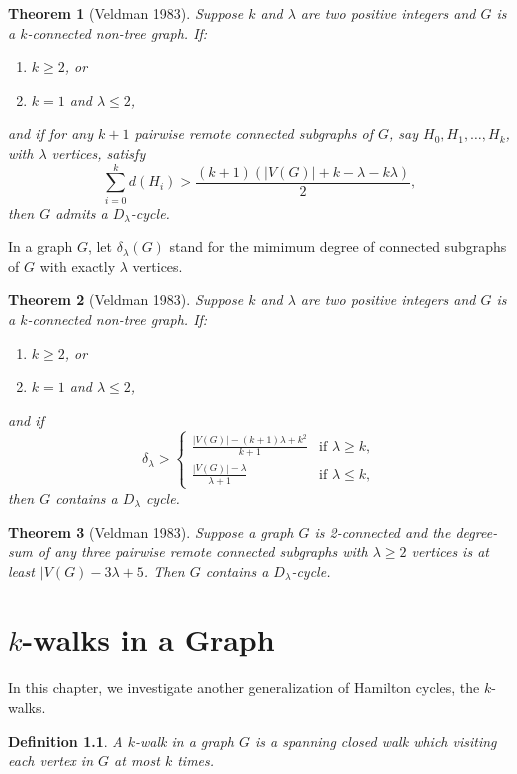 \documentclass[12pt]{report}
\newtheorem{theorem}{Theorem}
\newtheorem{definition}{Definition}
\begin{document}
\begin{theorem}[Veldman 1983]\label{thm3inveldlamc83}
Suppose $k$ and $\lambda$ are two positive integers and $G$ is a $k$-connected non-tree graph. If:
\begin{enumerate}
\item $k\ge2$, or
\item $k=1$ and $\lambda\le2$,
\end{enumerate}
and if for any $k+1$ pairwise remote connected subgraphs of $G$, say $H_0,H_1,\ldots,H_k$, with $\lambda$ vertices, satisfy $$\sum^k_{i=0}d(H_i)>\frac{(k+1)(|V(G)|+k-\lambda-k\lambda)}{2},$$
then $G$ admits a $D_{\lambda}$-cycle.

\end{theorem}
In a graph $G$, let $\delta_{\lambda}(G)$ stand for the mimimum degree of connected subgraphs of $G$ with exactly $\lambda$ vertices.
\begin{theorem}[Veldman 1983]\label{thm4inveldlamc83}
Suppose $k$ and $\lambda$ are two positive integers and $G$ is a $k$-connected non-tree graph. If:
\begin{enumerate}
\item $k\ge2$, or
\item $k=1$ and $\lambda\le2$,
\end{enumerate}
and if $$\delta_{\lambda}>\left\{\begin{array}{cc}\frac{|V(G)|-(k+1)\lambda+k^2}{k+1}&\text{if }\lambda\ge k,\\ \frac{|V(G)|-\lambda}{\lambda+1}&\text{if }\lambda\le k,\end{array}\right.$$
then $G$ contains a $D_{\lambda}$ cycle.
\end{theorem}

\begin{theorem}[Veldman 1983]\label{thm5inveldlamc83}
Suppose a graph $G$ is 2-connected and the degree-sum of any three pairwise remote connected subgraphs with $\lambda\ge2$ vertices is at least $|V(G)-3\lambda+5$. Then $G$ contains a $D_{\lambda}$-cycle.

\end{theorem}










\chapter{$k$-walks in a Graph}\label{ch4kw}
In this chapter, we investigate another generalization of Hamilton cycles, the $k$-walks. 
\begin{definition}\label{defkwalk}
A $k$-walk in a graph $G$ is a spanning closed walk which visiting each vertex in $G$ at most $k$ times.
\end{definition}
\end{document}
